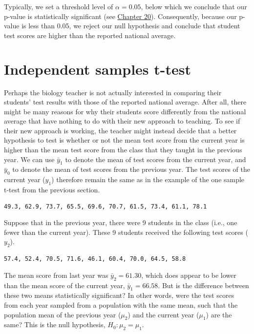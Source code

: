 \documentclass[
]{scrbook}
\begin{document}
Typically, we set a threshold level of \(\alpha = 0.05\), below which we conclude that our p-value is statistically significant (see \protect\hyperlink{Chapter_20}{Chapter 20}).
Consequently, because our p-value is less than 0.05, we reject our null hypothesis and conclude that student test scores are higher than the reported national average.

\hypertarget{independent-samples-t-test}{%
\section{Independent samples t-test}\label{independent-samples-t-test}}

Perhaps the biology teacher is not actually interested in comparing their students' test results with those of the reported national average.
After all, there might be many reasons for why their students score differently from the national average that have nothing to do with their new approach to teaching.
To see if their new approach is working, the teacher might instead decide that a better hypothesis to test is whether or not the mean test score from the current year is higher than the mean test score from the class that they taught in the previous year.
We can use \(\bar{y}_{1}\) to denote the mean of test scores from the current year, and \(\bar{y}_{0}\) to denote the mean of test scores from the previous year.
The test scores of the current year (\(y_{1}\)) therefore remain the same as in the example of the one sample t-test from the previous section.

\begin{verbatim}
49.3, 62.9, 73.7, 65.5, 69.6, 70.7, 61.5, 73.4, 61.1, 78.1
\end{verbatim}

Suppose that in the previous year, there were 9 students in the class (i.e., one fewer than the current year).
These 9 students received the following test scores (\(y_{2}\)).

\begin{verbatim}
57.4, 52.4, 70.5, 71.6, 46.1, 60.4, 70.0, 64.5, 58.8
\end{verbatim}

The mean score from last year was \(\bar{y}_{2} = 61.30\), which does appear to be lower than the mean score of the current year, \(\bar{y}_{1} = 66.58\).
But is the difference between these two means statistically significant?
In other words, were the test scores from each year sampled from a population with the same mean, such that the population mean of the previous year (\(\mu_{2}\)) and the current year (\(\mu_{1}\)) are the same?
This is the null hypothesis, \(H_{0}: \mu_{2} = \mu_{1}\).
\end{document}
